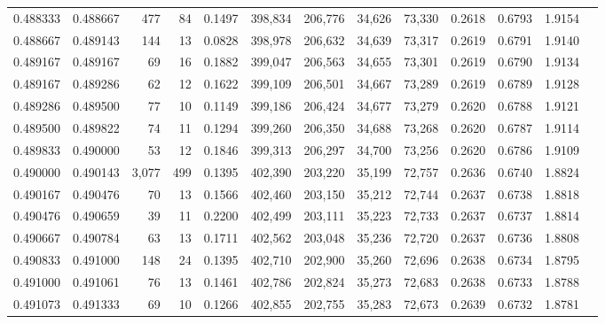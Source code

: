 \begin{tabular}{rrrrrrrrrrrrr}
0.488333 & 0.488667 &   477 &  84 &                                     0.1497 & 398,834 & 206,776 &  34,626 &  73,330 & 0.2618 & 0.6793 & 1.9154 \\
0.488667 & 0.489143 &   144 &  13 &                                     0.0828 & 398,978 & 206,632 &  34,639 &  73,317 & 0.2619 & 0.6791 & 1.9140 \\
0.489167 & 0.489167 &    69 &  16 &                                     0.1882 & 399,047 & 206,563 &  34,655 &  73,301 & 0.2619 & 0.6790 & 1.9134 \\
0.489167 & 0.489286 &    62 &  12 &                                     0.1622 & 399,109 & 206,501 &  34,667 &  73,289 & 0.2619 & 0.6789 & 1.9128 \\
0.489286 & 0.489500 &    77 &  10 &                                     0.1149 & 399,186 & 206,424 &  34,677 &  73,279 & 0.2620 & 0.6788 & 1.9121 \\
0.489500 & 0.489822 &    74 &  11 &                                     0.1294 & 399,260 & 206,350 &  34,688 &  73,268 & 0.2620 & 0.6787 & 1.9114 \\
0.489833 & 0.490000 &    53 &  12 &                                     0.1846 & 399,313 & 206,297 &  34,700 &  73,256 & 0.2620 & 0.6786 & 1.9109 \\
0.490000 & 0.490143 & 3,077 & 499 &                                     0.1395 & 402,390 & 203,220 &  35,199 &  72,757 & 0.2636 & 0.6740 & 1.8824 \\
0.490167 & 0.490476 &    70 &  13 &                                     0.1566 & 402,460 & 203,150 &  35,212 &  72,744 & 0.2637 & 0.6738 & 1.8818 \\
0.490476 & 0.490659 &    39 &  11 &                                     0.2200 & 402,499 & 203,111 &  35,223 &  72,733 & 0.2637 & 0.6737 & 1.8814 \\
0.490667 & 0.490784 &    63 &  13 &                                     0.1711 & 402,562 & 203,048 &  35,236 &  72,720 & 0.2637 & 0.6736 & 1.8808 \\
0.490833 & 0.491000 &   148 &  24 &                                     0.1395 & 402,710 & 202,900 &  35,260 &  72,696 & 0.2638 & 0.6734 & 1.8795 \\
0.491000 & 0.491061 &    76 &  13 &                                     0.1461 & 402,786 & 202,824 &  35,273 &  72,683 & 0.2638 & 0.6733 & 1.8788 \\
0.491073 & 0.491333 &    69 &  10 &                                     0.1266 & 402,855 & 202,755 &  35,283 &  72,673 & 0.2639 & 0.6732 & 1.8781 \\

\end{tabular}

